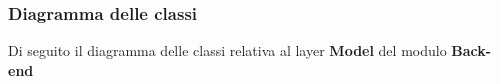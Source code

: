 \subsubsection{Diagramma delle classi}
Di seguito il diagramma delle classi relativa al layer \textbf{Model} del modulo \textbf{Back-end}
